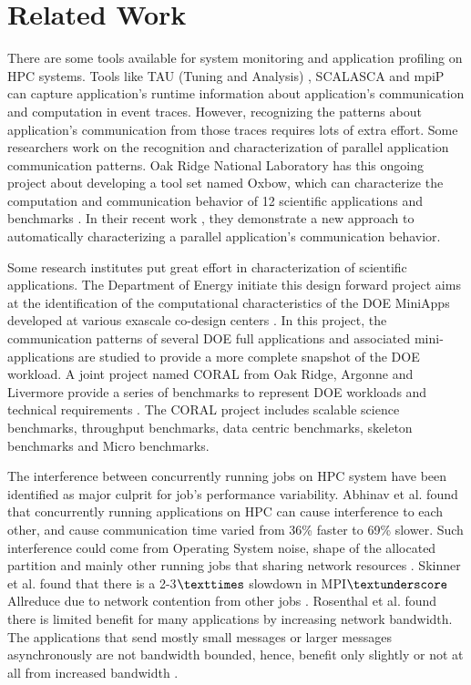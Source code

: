 \documentclass[conference]{IEEEtran}
\begin{document}
\section{Related Work}
\label{sec:related_work}
There are some tools available for system monitoring and application profiling on HPC systems. Tools like TAU (Tuning and Analysis) \cite{tau}, SCALASCA \cite{scala} and mpiP \cite{mpip} can capture application's runtime information about application's communication and computation in event traces. However, recognizing the patterns about application's communication from those traces requires lots of extra effort. Some researchers work on the recognition and characterization of parallel application communication patterns. Oak Ridge National Laboratory has this ongoing project about developing a tool set named Oxbow, which can characterize the computation and communication behavior of 12 scientific applications and benchmarks \cite{oxbow}. In their recent work \cite{roth}, they demonstrate a new approach to automatically characterizing a parallel application's communication behavior. 

Some research institutes put great effort in characterization of scientific applications. The Department of Energy initiate this design forward project aims at the identification of the computational characteristics of the DOE MiniApps developed at various exascale co-design centers \cite{designforwardwebpage}. In this project, the communication patterns of several DOE full applications and associated mini-applications are studied to provide a more complete snapshot of the DOE workload. A joint project named CORAL from Oak Ridge, Argonne and Livermore provide a series of benchmarks to represent DOE workloads and technical requirements \cite{coral}. The CORAL project includes scalable science benchmarks, throughput benchmarks, data centric benchmarks, skeleton benchmarks and Micro benchmarks.  

The interference between concurrently running jobs on HPC system have been identified as major culprit for job's performance variability. Abhinav et al. found that concurrently running applications on HPC can cause interference to each other, and cause communication time varied from 36\% faster to 69\% slower. Such interference could come from Operating System noise, shape of the allocated partition and mainly other running jobs that sharing network resources \cite{abhinav-sc13}. Skinner et al. found that  there is a 2-3$\texttimes$ slowdown in MPI$\textunderscore$Allreduce due to network contention from other jobs \cite{skinner}. Rosenthal et al. found there is limited benefit for many applications by increasing network bandwidth. The applications that send mostly small messages or larger messages asynchronously are not bandwidth bounded, hence, benefit only slightly or not at all from increased bandwidth \cite{rosenthal}.
\end{document}
